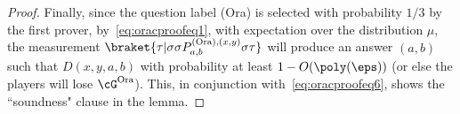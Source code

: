 \begin{proof}
Finally, since the question label (Ora) is selected with probability $1/3$ by the first prover, by~\eqref{eq:oracproofeq1}, with expectation over the distribution $\mu$, the measurement $\braket{\tau|\sigma \sigma P^{\text{(Ora)},(x,y)}_{a,b} \sigma \tau}$ will produce an answer $(a,b)$ such that $D(x,y,a,b)$ with probability at least $1 - O(\poly(\eps))$ (or else the players will lose $\cG^{\text{Ora}}$). This, in conjunction with~\eqref{eq:oracproofeq6}, shows the ``soundness" clause in the lemma.
	
	

\end{proof}
